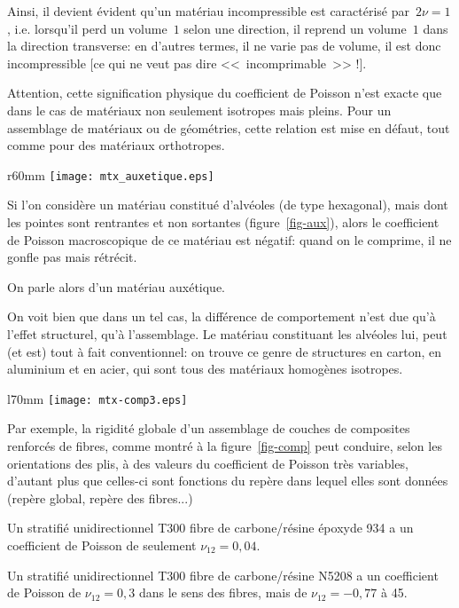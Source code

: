 Ainsi, il devient évident qu'un matériau incompressible
est caractérisé par~$2\nu=1$,
i.e. lorsqu'il perd un volume~$1$ selon une direction, il reprend un volume~$1$ dans
la direction transverse: en d'autres termes, il ne varie pas de volume, il est donc
incompressible [ce qui ne veut pas dire <<~incomprimable~>> !].

\medskip
Attention, cette signification physique du coefficient de Poisson n'est exacte que dans le cas 
de matériaux non seulement isotropes mais pleins.
Pour un assemblage de matériaux ou de géométries, cette relation est mise en
défaut, tout comme pour des matériaux orthotropes.

\medskip
\begin{wrapfigure}{r}{60mm}
  \centering
  \texttt{[image: mtx\_auxetique.eps]}
  \caption{Matériau auxétique}\label{fig-aux}
\end{wrapfigure}
Si l'on considère un matériau constitué d'alvéoles (de type hexagonal), mais dont
les pointes sont rentrantes et non sortantes (figure~\ref{fig-aux}), alors le coefficient de Poisson macroscopique 
de ce matériau est négatif: quand on le comprime, il ne gonfle pas mais rétrécit.

On parle alors d'un matériau auxétique.

On voit bien que dans un tel cas, la différence de comportement n'est due qu'à l'effet structurel, qu'à l'assemblage.
Le matériau constituant les alvéoles lui, peut (et est) tout à fait conventionnel: on trouve ce genre de structures
en carton, en aluminium et en acier, qui sont tous des matériaux homogènes isotropes.


\medskip
\begin{wrapfigure}{l}{70mm}
  \centering
  \texttt{[image: mtx-comp3.eps]}
  \caption{Matériau composite}\label{fig-comp}
\end{wrapfigure}
Par exemple, la rigidité globale d'un assemblage de couches de composites
renforcés de fibres, comme montré à la figure~\ref{fig-comp} peut conduire, selon les orientations des plis, à des
valeurs du coefficient de Poisson très variables, d'autant plus que celles-ci sont fonctions du repère dans lequel
elles sont données (repère global, repère des fibres...)

Un stratifié unidirectionnel T300 fibre de carbone/résine époxyde 934 a un coefficient de Poisson de seulement $\nu_{12}=0,04$.

Un stratifié unidirectionnel T300 fibre de carbone/résine N5208 a un coefficient de Poisson de $\nu_{12}=0,3$ dans le sens des fibres,
mais de $\nu_{12}=-0,77$ à 45\degres.

